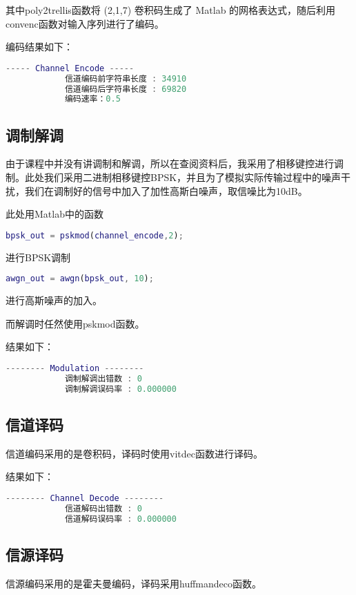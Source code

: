 \documentclass{../source/Experiment}
\begin{document}
其中poly2trellis函数将 (2,1,7) 卷积码生成了 Matlab 的网格表达式，随后利用convenc函数对输入序列进行了编码。

编码结果如下：
\begin{lstlisting}[language = matlab]
            ----- Channel Encode -----
            信道编码前字符串长度 : 34910
            信道编码后字符串长度 : 69820
            编码速率：0.5
            \end{lstlisting}

\subsection{调制解调}
由于课程中并没有讲调制和解调，所以在查阅资料后，我采用了相移键控进行调制。此处我们采用二进制相移键控BPSK，并且为了模拟实际传输过程中的噪声干扰，我们在调制好的信号中加入了加性高斯白噪声，取信噪比为10dB。

此处用Matlab中的函数
\begin{lstlisting}[language = matlab]
            bpsk_out = pskmod(channel_encode,2);
            \end{lstlisting}
进行BPSK调制
\begin{lstlisting}[language = matlab]
            awgn_out = awgn(bpsk_out, 10);
            \end{lstlisting}
进行高斯噪声的加入。

而解调时任然使用pskmod函数。

结果如下：

\begin{lstlisting}[language = matlab]
            -------- Modulation --------
            调制解调出错数 : 0
            调制解调误码率 : 0.000000
            \end{lstlisting}

\subsection{信道译码}
信道编码采用的是卷积码，译码时使用vitdec函数进行译码。

结果如下：
\begin{lstlisting}[language = matlab]
            -------- Channel Decode --------
            信道解码出错数 : 0
            信道解码误码率 : 0.000000
            \end{lstlisting}


\subsection{信源译码}
信源编码采用的是霍夫曼编码，译码采用huffmandeco函数。
\end{document}
